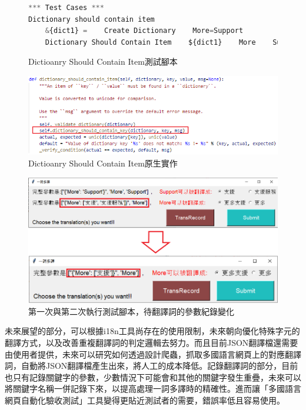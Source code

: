 \begin{figure}[H]
\centering
\begin{lstlisting}[language={python}]
*** Test Cases ***
Dictionary should contain item
    &{dict1} =    Create Dictionary    More=Support
    Dictionary Should Contain Item    ${dict1}    More    Support
\end{lstlisting}
\caption{Dictioanry Should Contain Item測試腳本}
\end{figure}

\begin{figure}[H]
\centering
\includegraphics[width= \textwidth]{../論文截圖/5-1-2 dictionary should contain item測試腳本與其原生實作.png}
\caption{Dictioanry Should Contain Item原生實作}
\end{figure}

\begin{figure}[H]
\centering
\includegraphics[width= \textwidth]{../論文截圖/5-1-3 1st&2nd執行測試腳本，待翻譯詞的參數紀錄變化.png}
\caption{第一次與第二次執行測試腳本，待翻譯詞的參數紀錄變化}
\end{figure}

未來展望的部分，可以根據i18n工具尚存在的使用限制，未來朝向優化特殊字元的翻譯方式，以及改善重複翻譯詞的判定邏輯去努力。而且目前JSON翻譯檔還需要由使用者提供，未來可以研究如何透過設計爬蟲，抓取多國語言網頁上的對應翻譯詞，自動將JSON翻譯檔產生出來，將人工的成本降低。記錄翻譯詞的部分，目前也只有記錄關鍵字的參數，少數情況下可能會和其他的關鍵字發生重疊，未來可以將關鍵字名稱一併記錄下來，以提高處理一詞多譯時的精確性。進而讓「多國語言網頁自動化驗收測試」工具變得更貼近測試者的需要，錯誤率低且容易使用。
